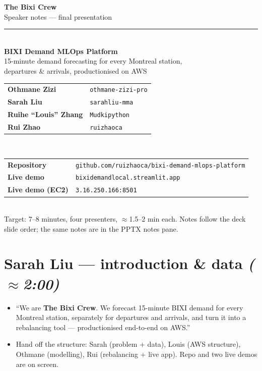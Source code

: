\documentclass[11pt]{article}
\newcommand{\presenter}[2]{\par\medskip\noindent{\color{#2}\rule{3pt}{12pt}}\hspace{4pt}{\bfseries #1}\par}
\newcommand{\timing}[1]{\hfill{\small\itshape\color{slate}(#1)}}
\begin{document}
\begin{titlepage}
\centering
\vspace*{2.2cm}
{\color{bixired}\Huge\bfseries The Bixi Crew}\\[6pt]
{\color{slate}\Large Speaker notes --- final presentation}\\[10pt]
\rule{0.7\linewidth}{1pt}\\[14pt]
{\LARGE\bfseries BIXI Demand MLOps Platform}\\[8pt]
{\large 15-minute demand forecasting for every Montreal station,\\[2pt]
departures \& arrivals, productionised on AWS}\\[26pt]

\begin{tabular}{ll}
\bfseries Othmane Zizi & \texttt{othmane-zizi-pro}\\[3pt]
\bfseries Sarah Liu & \texttt{sarahliu-mma}\\[3pt]
\bfseries Ruihe ``Louis'' Zhang & \texttt{Mudkipython}\\[3pt]
\bfseries Rui Zhao & \texttt{ruizhaoca}\\
\end{tabular}\\[26pt]

\begin{tabular}{ll}
\bfseries Repository & \texttt{github.com/ruizhaoca/bixi-demand-mlops-platform}\\[3pt]
\bfseries Live demo & \texttt{bixidemandlocal.streamlit.app}\\[3pt]
\bfseries Live demo (EC2) & \texttt{3.16.250.166:8501}\\
\end{tabular}\\[26pt]

{\small\color{slate}Target: 7--8 minutes, four presenters, $\approx$1.5--2 min each.
Notes follow the deck slide order; the same notes are in the PPTX notes pane.}
\end{titlepage}

\section{Sarah Liu --- introduction \& data \timing{$\approx$2:00}}
\presenter{Slide 0 --- Title (shared open, Sarah leads)}{bixired}
\begin{itemize}
  \item ``We are \textbf{The Bixi Crew}. We forecast 15-minute BIXI demand for every Montreal
        station, separately for departures and arrivals, and turn it into a rebalancing tool ---
        productionised end-to-end on AWS.''
  \item Hand off the structure: Sarah (problem + data), Louis (AWS structure), Othmane (modelling),
        Rui (rebalancing + live app). Repo and two live demos are on screen.
\end{itemize}
\end{document}

